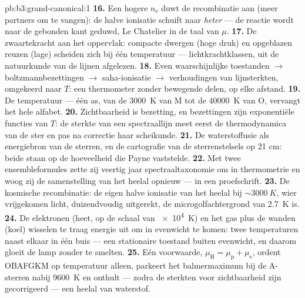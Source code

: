 \begin{solution}{pb:b3:grand-canonical:1}
\textbf{16.} Een hogere $n_{\text{e}}$ duwt de recombinatie aan (meer
partners om te vangen): de halve ionisatie schuift naar \emph{heter} --- de
reactie wordt naar de gebonden kant geduwd, Le Chatelier in de taal van
$\mu$.
\textbf{17.} De zwaartekracht aan het oppervlak: compacte dwergen (hoge
druk) en opgeblazen reuzen (lage) scheiden zich bij één temperatuur ---
lichtkrachtklassen, uit de natuurkunde van de lijnen afgelezen.
\textbf{18.} Even waarschijnlijke toestanden $\to$ boltzmannbezettingen
$\to$ saha-ionisatie $\to$ verhoudingen van lijnsterkten, omgekeerd naar
$T$: een thermometer zonder bewegende delen, op elke afstand.
\textbf{19.} De temperatuur --- één as, van de \qty{3000}{K} van M tot de
\qty{40000}{K} van O, vervangt het hele alfabet.
\textbf{20.} Zichtbaarheid is bezetting, en bezettingen zijn exponentiële
functies van $T$: de sterkte van een spectraallijn meet eerst de
thermodynamica van de ster en pas na correctie haar scheikunde.
\textbf{21.} De waterstoffusie als energiebron van de sterren, en de
cartografie van de sterrenstelsels op 21 cm: beide staan op de hoeveelheid
die Payne vaststelde.
\textbf{22.} Met twee ensembleformules zette zij veertig jaar
spectraaltaxonomie om in thermometrie en woog zij de samenstelling van het
heelal opnieuw --- in een proefschrift.
\textbf{23.} De kosmische recombinatie: de eigen halve ionisatie van het
heelal bij $\sim\qty{3000}{K}$, wier vrijgekomen licht, duizendvoudig
uitgerekt, de microgolfachtergrond van \qty{2.7}{K} is.
\textbf{24.} De elektronen (heet, op de schaal van \qty{e4}{K}) en het gas
plus de wanden (koel) wisselen te traag energie uit om in evenwicht te
komen: twee temperaturen naast elkaar in één buis --- een stationaire
toestand buiten evenwicht, en daarom gloeit de lamp zonder te smelten.
\textbf{25.} Eén voorwaarde, $\mu_{\text{H}} = \mu_{\text{p}} +
\mu_{\text{e}}$, ordent OBAFGKM op temperatuur alleen, parkeert het
balmermaximum bij de A-sterren nabij \qty{9600}{K} en onthult --- zodra de
sterkten voor zichtbaarheid zijn gecorrigeerd --- een heelal van waterstof.
\end{solution}
